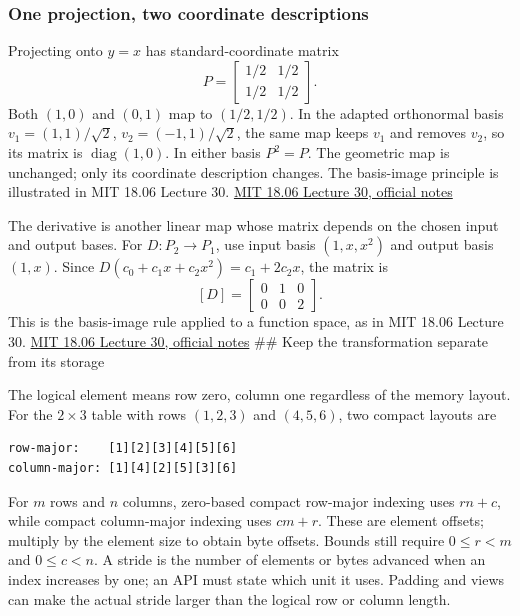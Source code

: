 \subsubsection{One projection, two coordinate descriptions}\label{01-foundations-i-ch018-one-projection-two-coordinate-descriptions}

\hypertarget{01-foundations-i-ch018-one-projection-two-coordinate-descriptions}{}

Projecting onto \(y=x\) has standard-coordinate matrix \[
P=\begin{bmatrix}1/2&1/2\\1/2&1/2\end{bmatrix}.
\] Both \((1,0)\) and \((0,1)\) map to \((1/2,1/2)\). In the adapted orthonormal basis \(v_1=(1,1)/\sqrt2\), \(v_2=(-1,1)/\sqrt2\), the same map keeps \(v_1\) and removes \(v_2\), so its matrix is \(\operatorname{diag}(1,0)\). In either basis \(P^2=P\). The geometric map is unchanged; only its coordinate description changes. The basis-image principle is illustrated in MIT 18.06 Lecture 30. \href{https://ocw.mit.edu/courses/18-06-linear-algebra-spring-2010/71bffaffa75c005516ee010daf17868b_MIT18_06S10_L30.pdf}{MIT 18.06 Lecture 30, official notes}

The derivative is another linear map whose matrix depends on the chosen input and output bases. For \(D:P_2\to P_1\), use input basis \((1,x,x^2)\) and output basis \((1,x)\). Since \(D(c_0+c_1x+c_2x^2)=c_1+2c_2x\), the matrix is \[
[D]=\begin{bmatrix}0&1&0\\0&0&2\end{bmatrix}.
\] This is the basis-image rule applied to a function space, as in MIT 18.06 Lecture 30. \href{https://ocw.mit.edu/courses/18-06-linear-algebra-spring-2010/71bffaffa75c005516ee010daf17868b_MIT18_06S10_L30.pdf}{MIT 18.06 Lecture 30, official notes} \#\# Keep the transformation separate from its storage

The logical element  means row zero, column one regardless of the memory layout. For the \(2\times3\) table with rows \((1,2,3)\) and \((4,5,6)\), two compact layouts are

\begin{verbatim}
row-major:    [1][2][3][4][5][6]
column-major: [1][4][2][5][3][6]
\end{verbatim}

For \(m\) rows and \(n\) columns, zero-based compact row-major indexing uses \(rn+c\), while compact column-major indexing uses \(cm+r\). These are element offsets; multiply by the element size to obtain byte offsets. Bounds still require \(0\le r<m\) and \(0\le c<n\). A stride is the number of elements or bytes advanced when an index increases by one; an API must state which unit it uses. Padding and views can make the actual stride larger than the logical row or column length.

